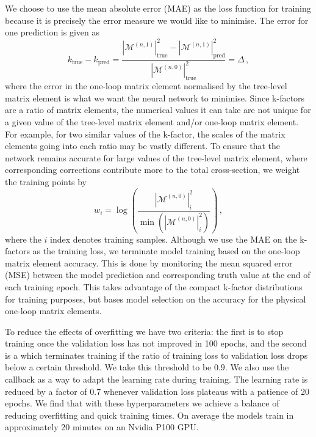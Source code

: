 \documentclass[main.tex]{subfiles}
\begin{document}
We choose to use the mean absolute error (MAE) as the loss
function for training because it is precisely the error measure we
would like to minimise.
The error for one prediction is given as
\begin{equation}
    k_{\mathrm{true}} - k_{\mathrm{pred}} = \dfrac{|\mathcal{M}^{(n, 1)}|^{2}_{\mathrm{true}} - |\mathcal{M}^{(n, 1)}|^{2}_{\mathrm{pred}}}{|\mathcal{M}^{(n, 0)}|^{2}_{\mathrm{true}}} = \Delta \, ,
    \label{eq:mae}
\end{equation}
where the error in the one-loop matrix element normalised
by the tree-level matrix element is what we want the
neural network to minimise.
Since k-factors are a ratio of matrix elements, the numerical
values it can take are not unique for a given value of the
tree-level matrix element and/or one-loop matrix element.
For example, for two similar values of the k-factor, the scales
of the matrix elements going into each ratio may be vastly different.
To ensure that the network remains accurate for large values
of the tree-level matrix element, where corresponding corrections
contribute more to the total cross-section, we weight the training
points by
\begin{equation}
    w_{i} = \log\left( \dfrac{|\mathcal{M}^{(n, 0)}|^{2}_{i}}{\min(|\mathcal{M}^{(n, 0)}|^{2}_{i})} \right) \, ,
\end{equation}
where the $i$ index denotes training samples.
Although we use the MAE on the k-factors as the training loss,
we terminate model training based on the one-loop matrix
element accuracy. This is done by monitoring the mean squared
error (MSE) between the model prediction and corresponding truth value
at the end of each training epoch.
This takes advantage of the compact k-factor distributions
for training purposes, but bases model selection on the
accuracy for the physical one-loop matrix elements.

To reduce the effects of overfitting we have two {\EarlyStopping}
criteria: the first is to stop training once the validation loss has
not improved in 100 epochs, and the second is a {\RatioEarlyStopping}
which terminates training if the ratio of training loss to validation
loss drops below a certain threshold. We take this threshold
to be $0.9$. We also use the {\ReduceLROnPlateau}
callback as a way to adapt the learning rate during training.
The learning rate is reduced by a factor of 0.7 whenever
validation loss plateaus with a patience of 20 epochs. We find
that with these hyperparameters we achieve a balance of reducing
overfitting and quick training times. On average the models
train in approximately 20 minutes on an Nvidia P100 GPU.
\end{document}

